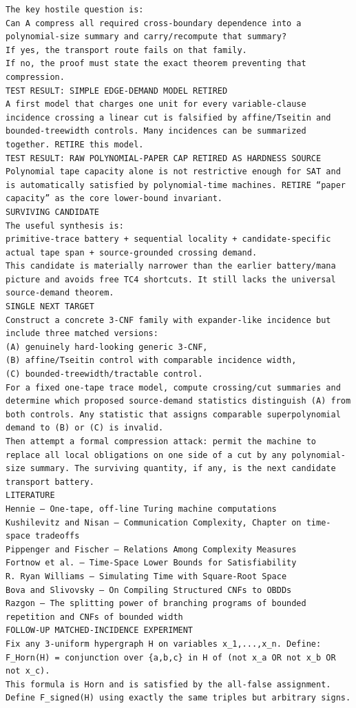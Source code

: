\documentclass[11pt]{article}
\begin{document}
\begin{Verbatim}[breaklines=true,breakanywhere=true]
The key hostile question is:
Can A compress all required cross-boundary dependence into a polynomial-size summary and carry/recompute that summary?
If yes, the transport route fails on that family.
If no, the proof must state the exact theorem preventing that compression.
TEST RESULT: SIMPLE EDGE-DEMAND MODEL RETIRED
A first model that charges one unit for every variable-clause incidence crossing a linear cut is falsified by affine/Tseitin and bounded-treewidth controls. Many incidences can be summarized together. RETIRE this model.
TEST RESULT: RAW POLYNOMIAL-PAPER CAP RETIRED AS HARDNESS SOURCE
Polynomial tape capacity alone is not restrictive enough for SAT and is automatically satisfied by polynomial-time machines. RETIRE “paper capacity” as the core lower-bound invariant.
SURVIVING CANDIDATE
The useful synthesis is:
primitive-trace battery + sequential locality + candidate-specific actual tape span + source-grounded crossing demand.
This candidate is materially narrower than the earlier battery/mana picture and avoids free TC4 shortcuts. It still lacks the universal source-demand theorem.
SINGLE NEXT TARGET
Construct a concrete 3-CNF family with expander-like incidence but include three matched versions:
(A) genuinely hard-looking generic 3-CNF,
(B) affine/Tseitin control with comparable incidence width,
(C) bounded-treewidth/tractable control.
For a fixed one-tape trace model, compute crossing/cut summaries and determine which proposed source-demand statistics distinguish (A) from both controls. Any statistic that assigns comparable superpolynomial demand to (B) or (C) is invalid.
Then attempt a formal compression attack: permit the machine to replace all local obligations on one side of a cut by any polynomial-size summary. The surviving quantity, if any, is the next candidate transport battery.
LITERATURE
Hennie — One-tape, off-line Turing machine computations
Kushilevitz and Nisan — Communication Complexity, Chapter on time-space tradeoffs
Pippenger and Fischer — Relations Among Complexity Measures
Fortnow et al. — Time-Space Lower Bounds for Satisfiability
R. Ryan Williams — Simulating Time with Square-Root Space
Bova and Slivovsky — On Compiling Structured CNFs to OBDDs
Razgon — The splitting power of branching programs of bounded repetition and CNFs of bounded width
FOLLOW-UP MATCHED-INCIDENCE EXPERIMENT
Fix any 3-uniform hypergraph H on variables x_1,...,x_n. Define:
F_Horn(H) = conjunction over {a,b,c} in H of (not x_a OR not x_b OR not x_c).
This formula is Horn and is satisfied by the all-false assignment.
Define F_signed(H) using exactly the same triples but arbitrary signs.

\end{Verbatim}
\end{document}
